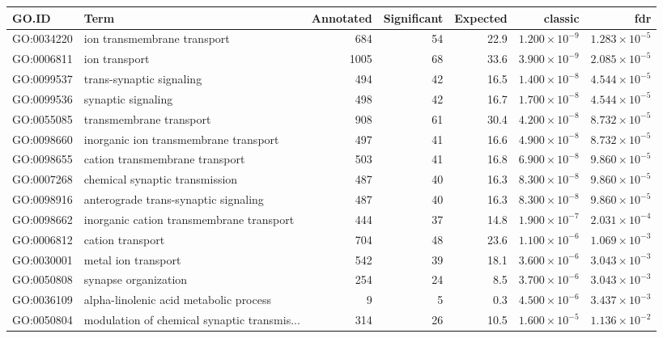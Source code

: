 \begin{table}[ht]
\centering
\begin{adjustbox}{max width=\textwidth}
\begin{tabular}{llrrrrr}
  \hline
GO.ID & Term & Annotated & Significant & Expected & classic & fdr \\ 
  \hline
GO:0034220 & ion transmembrane transport & 684 & 54 & 22.9 & $1.200 \times 10^{-9}$ & $1.283 \times 10^{-5}$ \\ 
  GO:0006811 & ion transport & 1005 & 68 & 33.6 & $3.900 \times 10^{-9}$ & $2.085 \times 10^{-5}$ \\ 
  GO:0099537 & trans-synaptic signaling & 494 & 42 & 16.5 & $1.400 \times 10^{-8}$ & $4.544 \times 10^{-5}$ \\ 
  GO:0099536 & synaptic signaling & 498 & 42 & 16.7 & $1.700 \times 10^{-8}$ & $4.544 \times 10^{-5}$ \\ 
  GO:0055085 & transmembrane transport & 908 & 61 & 30.4 & $4.200 \times 10^{-8}$ & $8.732 \times 10^{-5}$ \\ 
  GO:0098660 & inorganic ion transmembrane transport & 497 & 41 & 16.6 & $4.900 \times 10^{-8}$ & $8.732 \times 10^{-5}$ \\ 
  GO:0098655 & cation transmembrane transport & 503 & 41 & 16.8 & $6.900 \times 10^{-8}$ & $9.860 \times 10^{-5}$ \\ 
  GO:0007268 & chemical synaptic transmission & 487 & 40 & 16.3 & $8.300 \times 10^{-8}$ & $9.860 \times 10^{-5}$ \\ 
  GO:0098916 & anterograde trans-synaptic signaling & 487 & 40 & 16.3 & $8.300 \times 10^{-8}$ & $9.860 \times 10^{-5}$ \\ 
  GO:0098662 & inorganic cation transmembrane transport & 444 & 37 & 14.8 & $1.900 \times 10^{-7}$ & $2.031 \times 10^{-4}$ \\ 
  GO:0006812 & cation transport & 704 & 48 & 23.6 & $1.100 \times 10^{-6}$ & $1.069 \times 10^{-3}$ \\ 
  GO:0030001 & metal ion transport & 542 & 39 & 18.1 & $3.600 \times 10^{-6}$ & $3.043 \times 10^{-3}$ \\ 
  GO:0050808 & synapse organization & 254 & 24 & 8.5 & $3.700 \times 10^{-6}$ & $3.043 \times 10^{-3}$ \\ 
  GO:0036109 & alpha-linolenic acid metabolic process & 9 & 5 & 0.3 & $4.500 \times 10^{-6}$ & $3.437 \times 10^{-3}$ \\ 
  GO:0050804 & modulation of chemical synaptic transmis... & 314 & 26 & 10.5 & $1.600 \times 10^{-5}$ & $1.136 \times 10^{-2}$ \\ 

\end{tabular}
\end{adjustbox}
\end{table}
